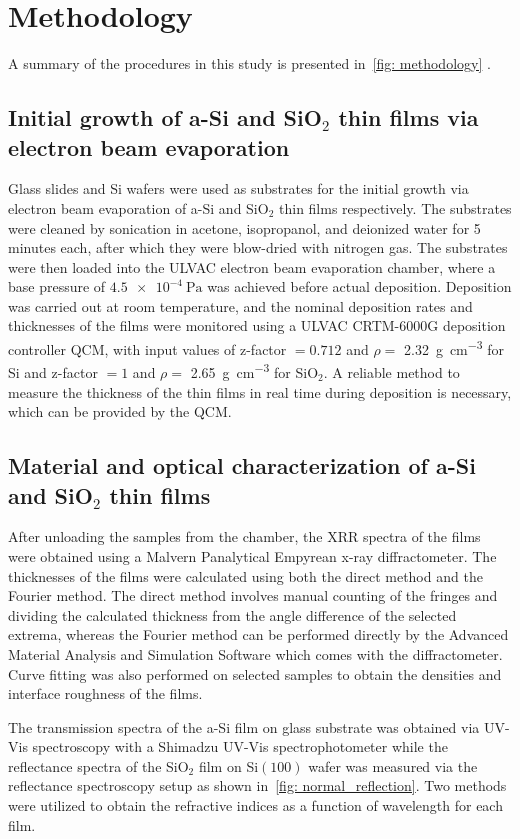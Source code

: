 \chapter{Methodology}\label{cha: Methodology}
A summary of the procedures in this study is presented in~\ref{fig: methodology} .
\section{Initial growth of a-Si and SiO\texorpdfstring{$_{2}$}{2} thin films via electron beam evaporation}\label{sec: growth}
Glass slides and Si wafers were used as substrates for the initial growth via electron beam evaporation of a-Si and SiO$_2$ thin films respectively. The substrates were cleaned by sonication in acetone, isopropanol, and deionized water for 5 minutes each, after which they were blow-dried with nitrogen gas. The substrates were then loaded into the ULVAC electron beam evaporation chamber, where a base pressure of $\qty{4.5e-4}{\Pa}$ was achieved before actual deposition. Deposition was carried out at room temperature, and the nominal deposition rates and thicknesses of the films were monitored using a ULVAC CRTM-6000G deposition controller \gls{QCM}, with input values of z-factor $= 0.712$ and $\rho =$ \qty{2.32}{\gram\per\cubic\centi\meter} for Si and z-factor $= 1$ and $\rho =$ \qty{2.65}{\gram\per\cubic\centi\meter} for SiO$_2$. A reliable method to measure the thickness of the thin films in real time during deposition is necessary, which can be provided by the \gls{QCM}.
\section{Material and optical characterization of a-Si and SiO\texorpdfstring{$_{2}$}{2} thin films}\label{sec: analysis}
After unloading the samples from the chamber, the XRR spectra of the films were obtained using a Malvern Panalytical Empyrean x-ray diffractometer. The thicknesses of the films were calculated using both the direct method and the Fourier method. The direct method involves manual counting of the fringes and dividing the calculated thickness from the angle difference of the selected extrema, whereas the Fourier method can be performed directly by the Advanced Material Analysis and Simulation Software which comes with the diffractometer. Curve fitting was also performed on selected samples to obtain the densities and interface roughness of the films.

The transmission spectra of the a-Si film on glass substrate was obtained via UV-Vis spectroscopy with a Shimadzu UV-Vis spectrophotometer while the reflectance spectra of the SiO$_2$ film on Si$(100)$ wafer was measured via the reflectance spectroscopy setup as shown in~\ref{fig: normal_reflection}. Two methods were utilized to obtain the refractive indices as a function of wavelength for each film. 

